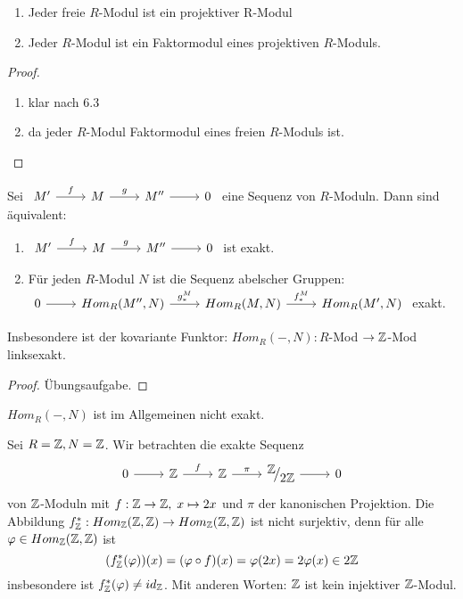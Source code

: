 \begin{fo}\label{6.4}
	\begin{enumerate} [label= \alph*)]
		\item Jeder freie $R$-Modul ist ein projektiver R-Modul
		\item Jeder $R$-Modul ist ein Faktormodul eines projektiven $R$-Moduls. 
	\end{enumerate}
\end{fo}
\begin{proof}
	\begin{enumerate} [label= \alph*)]
		\item klar nach 6.3
		\item da jeder $R$-Modul Faktormodul eines freien $R$-Moduls ist. 
	\end{enumerate}
\end{proof}
\begin{sa}\label{6.5}
	Sei $\begin{tikzcd}
	 M' \arrow{r}{f} & M \arrow{r}{g} & M'' \arrow{r} & 0
	\end{tikzcd} $ eine Sequenz von $R$-Moduln. Dann sind äquivalent:
	\begin{enumerate} [label= \roman*)]
		\item $\begin{tikzcd}
		M' \arrow{r}{f} & M \arrow{r}{g} & M'' \arrow{r} & 0
		\end{tikzcd} $ ist exakt.
		\item Für jeden $R$-Modul $N$ ist die Sequenz abelscher Gruppen: \\
		$\begin{tikzcd}
		0  \arrow{r} & Hom_{R}(M'',N) \arrow{r}{g_{*}^{M}} & Hom_{R}(M,N)  \arrow{r}{f_{*}^{M}} & Hom_{R}(M',N) \end{tikzcd}$ exakt.
	\end{enumerate}
	Insbesondere ist der kovariante Funktor: $Hom_R(-,N): R$-Mod $\to \mathbb{Z}$-Mod  linksexakt.
\end{sa}
\begin{proof}
	Übungsaufgabe.
\end{proof}
\begin{anm}
	$Hom_R(-,N) $ ist im Allgemeinen nicht exakt.
\end{anm}
\begin{bsp}
	Sei $ R= \mathbb{Z} , N = \mathbb{Z} $. Wir betrachten die exakte Sequenz \\
	 $$\begin{tikzcd}
	0  \arrow{r} & \Z \arrow{r}{f} & \Z \arrow{r}{\pi} & \QR{\Z}{2\Z} \arrow{r} & 0
	\end{tikzcd} $$ von $\mathbb{Z}$-Moduln mit $f: \mathbb{Z} \to \mathbb{Z} ,\; x \mapsto 2x$ und $ \pi $ der kanonischen Projektion. Die Abbildung $ f_{\mathbb{Z}}^{*} : Hom_{\mathbb{Z}}(\mathbb{Z},\mathbb{Z}) \to Hom_{\mathbb{Z}}(\mathbb{Z},\mathbb{Z})$ ist nicht surjektiv, denn für alle $\varphi \in Hom_{\mathbb{Z}}(\mathbb{Z},\mathbb{Z})$ ist $$ (f_{\mathbb{Z}}^{*}(\varphi))(x) = (\varphi \circ f)(x) = \varphi(2x) =2 \varphi(x) \in 2\mathbb{Z}$$
	insbesondere ist $ f_{\mathbb{Z}}^{*}(\varphi) \neq id_{\mathbb{Z}}$. Mit anderen Worten: $\mathbb{Z}$ ist kein injektiver $\mathbb{Z}$-Modul.
\end{bsp}
